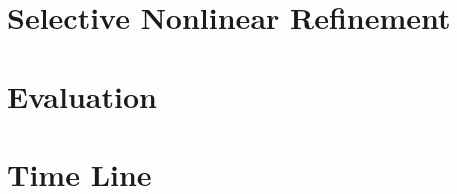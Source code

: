 \section{Selective Nonlinear Refinement}
\label{sect:selective_nonlinear_refinement}


\section{Evaluation}
\label{sect:future_eval}


\section{Time Line}
\label{sect:time_line}



